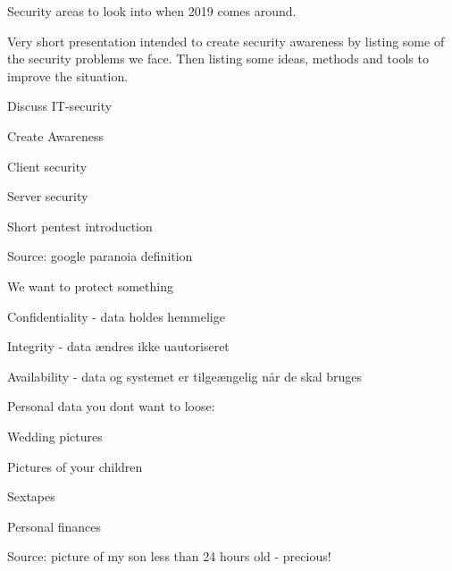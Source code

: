 \documentclass[20pt,landscape,a4paper,footrule]{foils}
\begin{document}



Security areas to look into when 2019 comes around.

Very short presentation intended to create security awareness by listing some of the security problems we face. Then listing some ideas, methods and tools to improve the situation.



\begin{list1}
\item Discuss IT-security
\item Create Awareness
\item Client security
\item Server security
\item Short pentest introduction
\end{list1}




Source: google paranoia definition



\begin{list1}
\item We want to protect something
\item Confidentiality - data holdes hemmelige
\item Integrity - data ændres ikke uautoriseret
\item Availability - data og systemet er tilgeængelig når de skal bruges
\end{list1}


\begin{list1}
\item Personal data you dont want to loose:
\begin{list2}
\item Wedding pictures
\item Pictures of your children
\item Sextapes
\item Personal finances
\end{list2}
\end{list1}

Source: picture of my son less than 24 hours old - precious!
\end{document}
